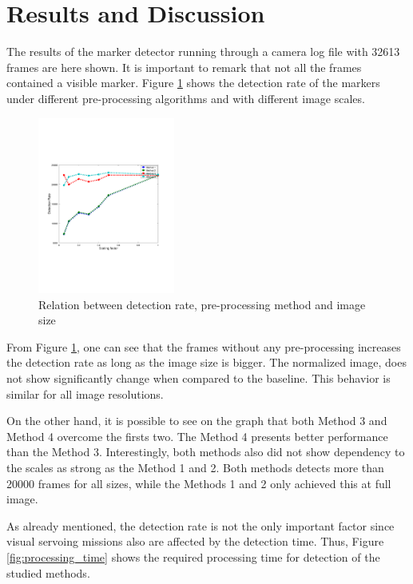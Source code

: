 \documentclass[conference, letterpaper]{IEEEtran}
\begin{document}
\section{Results and Discussion} \label{sec:results}

The results of the marker detector running through a camera log file with 32613
frames are here shown. It is important to remark that not all the frames
contained a visible marker. Figure \ref{fig:detection_rate} shows the detection
rate of the markers under different pre-processing algorithms and with
different image scales. 

\begin{figure}[!ht]
	\centering
    \includegraphics[width=0.4\textwidth, trim={1.6cm 6.9cm 2.3cm 6.7cm}]{./fig/detection_rate.pdf}
    \caption{Relation between detection rate, pre-processing method and image size}
	\label{fig:detection_rate}
\end{figure}

From Figure \ref{fig:detection_rate}, one can see that the frames without any
pre-processing increases the detection rate as long as the image size is bigger.
The normalized image, does not show significantly change when compared to the
baseline. This behavior is similar for all image resolutions.

On the other hand, it is possible to see on the graph that both Method 3 and
Method 4 overcome the firsts two. The Method 4 presents better performance
than the Method 3. Interestingly, both methods also did not show dependency to
the scales as strong as the Method 1 and 2. Both methods detects more than
20000 frames for all sizes, while the Methods 1 and 2 only achieved this at
full image. 

As already mentioned, the detection rate is not the only important factor since
visual servoing missions also are affected by the detection time. Thus, Figure
\ref{fig:processing_time} shows the required processing time for detection of
the studied methods.
\end{document}

